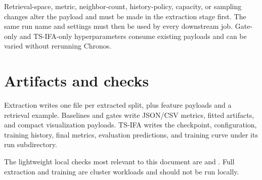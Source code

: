 \documentclass[11pt]{article}
\begin{document}
Retrieval-space, metric, neighbor-count, history-policy, capacity, or sampling
changes alter the payload and must be made in the extraction stage first.  The
same run name and settings must then be used by every downstream job.  Gate-only
and TS-IFA-only hyperparameters consume existing payloads and can be varied
without rerunning Chronos.

\section{Artifacts and checks}

Extraction writes one  file per extracted split,
plus feature payloads and a retrieval example.  Baselines and gates
write JSON/CSV metrics, fitted artifacts, and compact visualization payloads.
TS-IFA writes the checkpoint, configuration, training history, final metrics,
evaluation predictions, and training curve under its run subdirectory.

The lightweight local checks most relevant to this document are
 and
.  Full extraction and training are
cluster workloads and should not be run locally.
\end{document}
